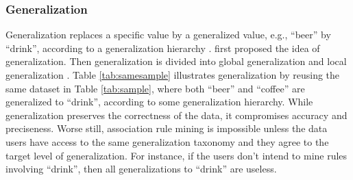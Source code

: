 \subsubsection{Generalization}

Generalization\cite{samarati1998,Iyengar:2002:TDS} replaces a specific value by
a generalized value, e.g., ``beer'' by ``drink'',
according to a generalization hierarchy \cite{FungWCY10:Survey}.
\cite{samarati1998} first proposed the idea of generalization.
Then generalization is divided into global generalization \cite{Iyengar:2002:TDS}
and local generalization \cite{LeFevre:2006:Mondrian}.
Table \ref{tab:samesample} illustrates generalization by reusing the
same dataset in Table \ref{tab:sample}, where both ``beer'' and ``coffee''
are generalized to ``drink'', according to some generalization hierarchy.
While generalization preserves the correctness of the data,
it compromises accuracy
and preciseness. Worse still, association rule mining is impossible
unless the data users have access to the same generalization taxonomy
and they agree to the target level of generalization. For instance, if
the users don't intend to mine rules involving ``drink'', then
all generalizations to ``drink'' are useless.

